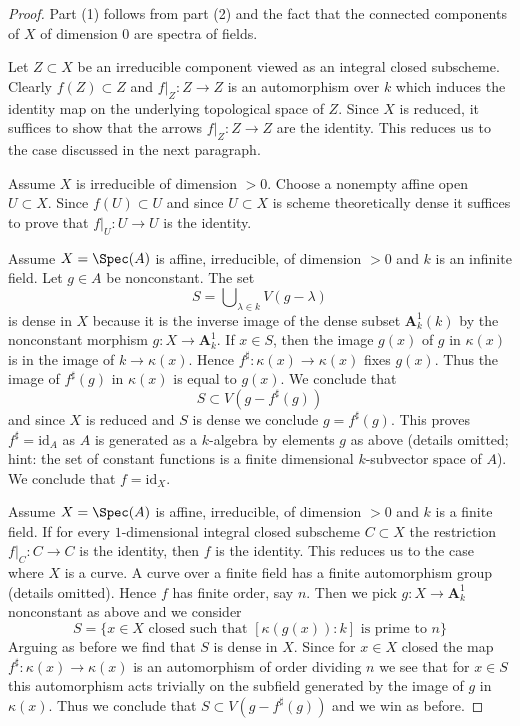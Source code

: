 \begin{proof}
Part (1) follows from part (2) and the fact that the connected components
of $X$ of dimension $0$ are spectra of fields.

\medskip\noindent
Let $Z \subset X$ be an irreducible component viewed as an integral closed
subscheme. Clearly $f(Z) \subset Z$ and $f|_Z : Z \to Z$ is an automorphism
over $k$ which induces the identity map on the underlying topological space
of $Z$. Since $X$ is reduced, it suffices to show that the arrows
$f|_Z : Z \to Z$ are the identity. This reduces us to the case discussed
in the next paragraph.

\medskip\noindent
Assume $X$ is irreducible of dimension $> 0$. Choose a nonempty
affine open $U \subset X$. Since $f(U) \subset U$ and since
$U \subset X$ is scheme theoretically dense it suffices to
prove that $f|_U : U \to U$ is the identity.

\medskip\noindent
Assume $X = \Spec(A)$ is affine, irreducible, of dimension $> 0$
and $k$ is an infinite field. Let $g \in A$ be nonconstant. The set
$$
S = \bigcup\nolimits_{\lambda \in k} V(g - \lambda)
$$
is dense in $X$ because it is the inverse image of the dense subset
$\mathbf{A}^1_k(k)$ by the nonconstant morphism $g : X \to \mathbf{A}^1_k$.
If $x \in S$, then the image $g(x)$ of $g$ in $\kappa(x)$
is in the image of $k \to \kappa(x)$. Hence
$f^\sharp : \kappa(x) \to \kappa(x)$ fixes $g(x)$.
Thus the image of $f^\sharp(g)$ in $\kappa(x)$ is equal to $g(x)$.
We conclude that
$$
S \subset V(g - f^\sharp(g))
$$
and since $X$ is reduced and $S$ is dense we conclude $g=f^\sharp(g)$.
This proves $f^\sharp = \text{id}_A$ as $A$ is generated as a $k$-algebra
by elements $g$ as above (details omitted; hint: the set of constant
functions is a finite dimensional $k$-subvector space of $A$).
We conclude that $f = \text{id}_X$.

\medskip\noindent
Assume $X = \Spec(A)$ is affine, irreducible, of dimension $> 0$
and $k$ is a finite field. If for every $1$-dimensional integral
closed subscheme $C \subset X$ the restriction $f|_C : C \to C$
is the identity, then $f$ is the identity. This reduces us to the
case where $X$ is a curve. A curve over a finite field has a
finite automorphism group (details omitted). Hence $f$ has finite
order, say $n$. Then we pick $g : X \to \mathbf{A}^1_k$
nonconstant as above and we consider
$$
S = \{x \in X\text{ closed such that }[\kappa(g(x)) : k]
\text{ is prime to }n\}
$$
Arguing as before we find that $S$ is dense in $X$. Since
for $x \in X$ closed the map
$f^\sharp : \kappa(x) \to \kappa(x)$ is an
automorphism of order dividing $n$
we see that for $x \in S$ this automorphism
acts trivially on the subfield generated by
the image of $g$ in $\kappa(x)$. Thus we conclude that
$S \subset V(g - f^\sharp(g))$ and we win as before.
\end{proof}







